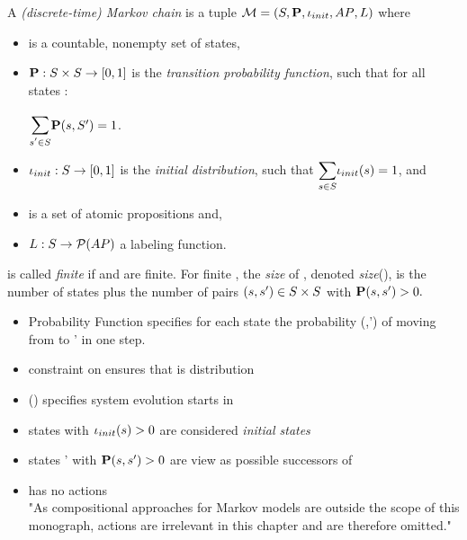 \documentclass[preview]{standalone}
\begin{document}
	
	\begin{definition}
		A \emph{(discrete-time) Markov chain} is a tuple ${\mathcal{M}} = ({S}, {\textbf{P}}, {\iota_{init}}, {AP}, {L})$ where 
		\begin{itemize}
			\item \states is a countable, nonempty set of states,
			\item ${\textbf{P}} : {S} \times {S} \to [0,1]$ is the \emph{transition probability function}, such that for all states \state:
			\begin{center}
				$\bbigsum{\state' \in \states}\probtfunc(\state,\states') = 1$.	
			\end{center}
			\item ${\iota_{init}} : {S} \to [0,1]$ is the \emph{initial distribution}, such that $\mathlarger{\sum_{\state \in \states}} \initdistrib(\state) = 1$, and
			\item \atomicprops is a set of atomic propositions and,
			\item ${L} : {S} \to {\mathcal{P}(\ensuremath{{AP}})}$ a labeling function.		
		\end{itemize}
		
		\autm is called \emph{finite} if \states and \atomicprops are finite. For finite \autm, the \emph{size} of \autm, denoted \emph{size}(\autm),  is the number of states plus the number of pairs $({s}, {s}') \in {S} \times {S}$ with ${\textbf{P}}({s}, {s}') > 0.$
	\end{definition}
	
	\begin{itemize}
		\item Probability Function \probtfunc specifies for each state \state the probability \probtfunc(\state,\state') of moving from \state to \state' in one step.
		\item constraint on \probtfunc ensures that \probtfunc is distribution
		\item \initdistrib(\state) specifies system evolution starts in \state
		\item states \state with ${\iota_{init}}({s}) > 0$ are  considered \emph{initial states}
		\item states \state' with ${\textbf{P}}({s}, {s}') > 0$ are view as possible successors of \state
		\item has no actions \\ "As compositional approaches for Markov models are outside the scope of this monograph,
		actions are irrelevant in this chapter and are therefore omitted."
	\end{itemize}
	
\end{document}
